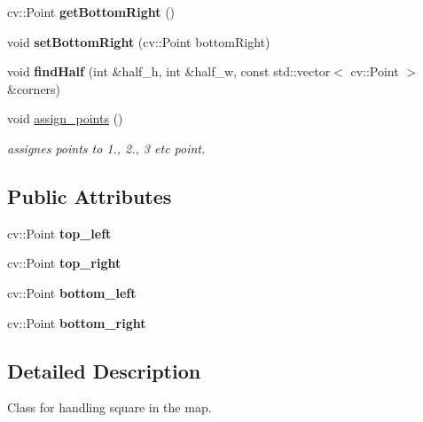 \begin{DoxyCompactItemize}
\mbox{\label{class_rectangle_a5b5aa3a6581a32dd9e2cfc27dbda4229}} 
cv\+::\+Point {\bfseries get\+Bottom\+Right} ()
\item 
\mbox{\label{class_rectangle_af5cf0dfffa35328bf5d7e890d0363354}} 
void {\bfseries set\+Bottom\+Right} (cv\+::\+Point bottom\+Right)
\item 
\mbox{\label{class_rectangle_ac88c4a06b2688500d1209957eba41335}} 
void {\bfseries find\+Half} (int \&half\+\_\+h, int \&half\+\_\+w, const std\+::vector$<$ cv\+::\+Point $>$ \&corners)
\item 
\mbox{\label{class_rectangle_a415da71ec3ad29982ab35efcfd447b37}} 
void \mbox{\hyperlink{class_rectangle_a415da71ec3ad29982ab35efcfd447b37}{assign\+\_\+points}} ()
\begin{DoxyCompactList}\small\item\em assignes points to 1., 2., 3 etc point. \end{DoxyCompactList}\end{DoxyCompactItemize}
\subsection*{Public Attributes}
\begin{DoxyCompactItemize}
\item 
\mbox{\label{class_rectangle_a705f4807bb92477bef644fcd63ed6c20}} 
cv\+::\+Point {\bfseries top\+\_\+left}
\item 
\mbox{\label{class_rectangle_aa6c87573306e8ee0a7470350bfe2a17f}} 
cv\+::\+Point {\bfseries top\+\_\+right}
\item 
\mbox{\label{class_rectangle_a5d2107189bd36969453560dce722ce6d}} 
cv\+::\+Point {\bfseries bottom\+\_\+left}
\item 
\mbox{\label{class_rectangle_a6ed1f4dfabeb0930b864e08fb5be5915}} 
cv\+::\+Point {\bfseries bottom\+\_\+right}
\end{DoxyCompactItemize}


\subsection{Detailed Description}
Class for handling square in the map. 

